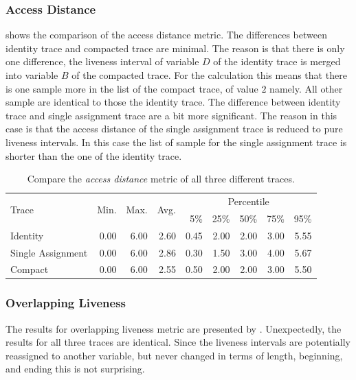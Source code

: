 \documentclass[onecolumn, openright, master, english, signatures]{dbrgrptt}
\begin{document}
\subsubsection{Access Distance}

 shows the comparison of the access distance metric. The differences between identity \ac{trace} and compacted \ac{trace} are minimal. The reason is that there is only one difference, the liveness interval of variable $D$ of the identity \ac{trace} is merged into variable $B$ of the compacted \ac{trace}. For the calculation this means that there is one sample more in the list of the compact \ac{trace}, of value $2$ namely. All other sample are identical to those the identity \ac{trace}. The difference between identity \ac{trace} and single assignment \ac{trace} are a bit more significant. The reason in this case is that the access distance of the single assignment \ac{trace} is reduced to pure liveness intervals. In this case the list of sample for the single assignment \ac{trace} is shorter than the one of the identity \ac{trace}.

\begin{table}[!ht]
  \centering
  \begin{tabular}{lrrrrrrrr}
    \hline
    \multirow{2}{*}{Trace} & \multirow{2}{*}{Min.} & \multirow{2}{*}{Max.} & \multirow{2}{*}{Avg.} & \multicolumn{5}{c}{Percentile} \tabularnewline
    & & & & 5\% & 25\% & 50\% & 75\% & 95\% \tabularnewline
    \hline
    Identity          & 0.00 & 6.00 & 2.60 & 0.45 & 2.00 & 2.00 & 3.00 & 5.55 \\
    Single Assignment & 0.00 & 6.00 & 2.86 & 0.30 & 1.50 & 3.00 & 4.00 & 5.67 \\
    Compact           & 0.00 & 6.00 & 2.55 & 0.50 & 2.00 & 2.00 & 3.00 & 5.50 \\
    \hline
  \end{tabular}
  \caption{Compare the \emph{access distance} metric of all three different \ac{trace}s.}
  \label{tab:summarizing-example-metrics-overview-access-distance}
\end{table}

\subsubsection{Overlapping Liveness}
The results for overlapping liveness metric are presented by . Unexpectedly, the results for all three \ac{trace}s are identical. Since the liveness intervals are potentially reassigned to another variable, but never changed in terms of length, beginning, and ending this is not surprising.
\end{document}
